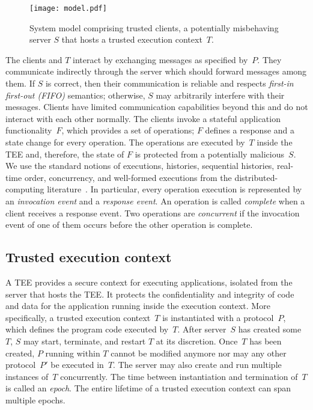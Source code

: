 \documentclass[11pt]{article}
\theoremstyle{plain-boldhead}
\theoremstyle{definition-boldhead}
\begin{document}
\begin{figure}[ht]
    \centering
   \texttt{[image: model.pdf]}
    \caption{
    System model comprising trusted clients, a potentially misbehaving server
    $S$ that hosts a trusted execution context~$T$.}
    \label{fig:model}
\end{figure}

The clients and $T$ interact by exchanging
messages as specified by~$P$.  They communicate indirectly through the server
which should forward messages among them.  If $S$ is correct, then their
communication is reliable and respects \emph {first-in first-out (FIFO)} 
semantics; otherwise, $S$ may arbitrarily interfere with their messages.
% 
Clients have limited communication capabilities beyond this and
do not interact with each other normally. 
% 
The clients invoke a stateful application functionality~$F$, which provides
a set of operations; $F$ defines a response and a state
change for every operation.  The operations are executed by~$T$ inside the
TEE and, therefore, the state of $F$ is protected from a potentially
malicious~$S$.
%
We use the standard notions of executions, histories, sequential histories,
real-time order, concurrency, and well-formed executions from the
distributed-computing literature~\cite{attwel04}.  In particular, every operation execution is
represented by an \emph{invocation event} and a \emph{response event}.  An
operation is called \emph{complete} when a client receives a response
event.  Two operations are \emph{concurrent} if the invocation event of one
of them occurs before the other operation is complete.


\subsection{Trusted execution context}

A TEE provides a secure context for executing applications, isolated from
the server that hosts the TEE.  It protects the confidentiality and
integrity of code and data for the application running inside the execution
context.  More specifically,
% 
a trusted execution context~$T$ is instantiated with a protocol~$P$, which
defines the program code executed by~$T$. After server~$S$ has created some
$T$, $S$ may start, terminate, and restart $T$ at
its discretion.
% 
Once~$T$ has been created, $P$ running within $T$ cannot be modified
anymore nor may any other protocol~$P'$ be executed in~$T$.
% 
The server may also create and run multiple
instances of~$T$ concurrently.
% 
The time between instantiation and termination of~$T$ is called an
\emph{epoch}.  The entire lifetime of a trusted execution context can span
multiple epochs.
\end{document}
